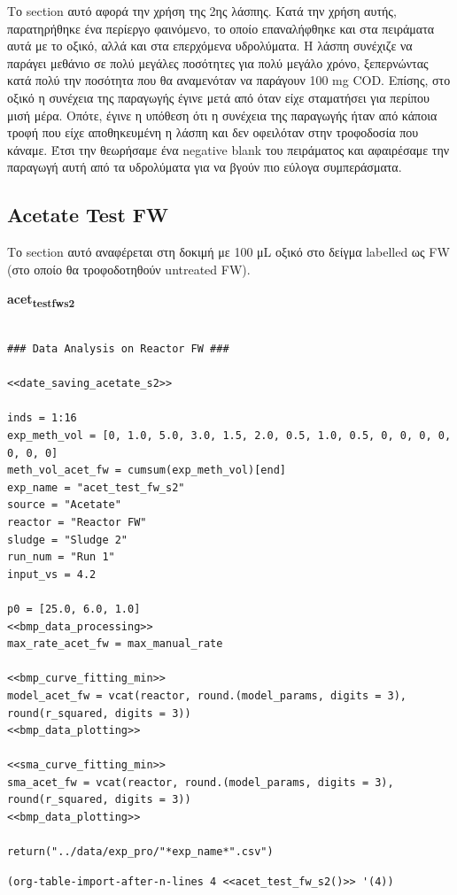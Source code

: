 \documentclass[11pt]{article}
\begin{document}
Το section αυτό αφορά την χρήση της 2ης λάσπης. Κατά την χρήση αυτής, παρατηρήθηκε ένα περίεργο φαινόμενο, το οποίο επαναλήφθηκε και στα πειράματα αυτά με το οξικό, αλλά και στα επερχόμενα υδρολύματα. Η λάσπη συνέχιζε να παράγει μεθάνιο σε πολύ μεγάλες ποσότητες για πολύ μεγάλο χρόνο, ξεπερνώντας κατά πολύ την ποσότητα που θα αναμενόταν να παράγουν 100 mg COD. Επίσης, στο οξικό η συνέχεια της παραγωγής έγινε μετά από όταν είχε σταματήσει για περίπου μισή μέρα. Οπότε, έγινε η υπόθεση ότι η συνέχεια της παραγωγής ήταν από κάποια τροφή που είχε αποθηκευμένη η λάσπη και δεν οφειλόταν στην τροφοδοσία που κάναμε. Έτσι την θεωρήσαμε ένα negative blank του πειράματος και αφαιρέσαμε την παραγωγή αυτή από τα υδρολύματα για να βγούν πιο εύλογα συμπεράσματα.

\subsection{Acetate Test FW}
\label{sec:orgcd56a97}
Το section αυτό αναφέρεται στη δοκιμή με 100 μL οξικό στο δείγμα labelled ως FW (στο οποίο θα τροφοδοτηθούν untreated FW). 

\textbf{acet\textsubscript{test}\textsubscript{fw}\textsubscript{s2}}
\begin{verbatim}

### Data Analysis on Reactor FW ###

<<date_saving_acetate_s2>>

inds = 1:16
exp_meth_vol = [0, 1.0, 5.0, 3.0, 1.5, 2.0, 0.5, 1.0, 0.5, 0, 0, 0, 0, 0, 0, 0]
meth_vol_acet_fw = cumsum(exp_meth_vol)[end]
exp_name = "acet_test_fw_s2"
source = "Acetate"
reactor = "Reactor FW"
sludge = "Sludge 2"
run_num = "Run 1"
input_vs = 4.2

p0 = [25.0, 6.0, 1.0]
<<bmp_data_processing>>
max_rate_acet_fw = max_manual_rate

<<bmp_curve_fitting_min>>
model_acet_fw = vcat(reactor, round.(model_params, digits = 3), round(r_squared, digits = 3))
<<bmp_data_plotting>>

<<sma_curve_fitting_min>>
sma_acet_fw = vcat(reactor, round.(model_params, digits = 3), round(r_squared, digits = 3))  
<<bmp_data_plotting>>

return("../data/exp_pro/"*exp_name*".csv")
\end{verbatim}

\begin{verbatim}
(org-table-import-after-n-lines 4 <<acet_test_fw_s2()>> '(4))
\end{verbatim}
\end{document}
